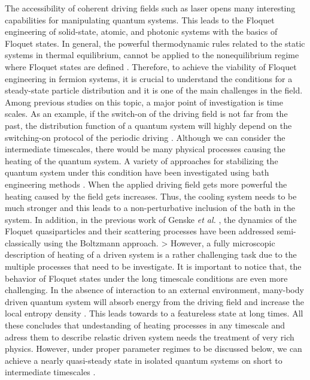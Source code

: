 \documentclass{article}
\begin{document}
The accessibility of coherent driving fields such as laser opens many interesting capabilities for manipulating quantum systems. This leads to the Floquet engineering of solid-state, atomic, and photonic systems with the basics of Floquet states. In general, the powerful thermodynamic rules related to the static systems in thermal equilibrium, cannot be applied to the nonequilibrium regime where Floquet states are defined \cite{seetharam2015}. Therefore, to achieve the viability of Floquet engineering in fermion systems, it is crucial to understand the conditions for a steady-state particle distribution and it is one of the main challenges in the field. Among previous studies on this topic, a major point of investigation is time scales. As an example, if the switch-on of the driving field is not far from the past, the distribution function of a quantum system will highly depend on the switching-on protocol of the periodic driving \cite{dehghani2014}. Although we can consider the intermediate timescales, there would be many physical processes causing the heating of the quantum system. A variety of approaches for stabilizing the quantum system under this condition have been investigated using bath engineering methods \cite{seetharam2015,weidinger2017,seetharam2019,rudner2020}. When the applied driving field gets more powerful the heating caused by the field gets increases. Thus, the cooling system needs to be much stronger and this leads to a non-perturbative inclusion of the bath in the system. In addition, in the previous work of Genske \textit{et al.} \cite{genske2015}, the dynamics of the Floquet quasiparticles and their scattering processes have been addressed semi-classically using the Boltzmann approach.
> However, a fully microscopic description of heating of a driven system is a rather challenging task due to the multiple processes that need to be investigate.
It is important to notice that, the behavior of Floquet states under the long timescale conditions are even more challenging. In the absence of interaction to an external environment, many-body driven quantum system will absorb energy from the driving field and increase the local entropy density \cite{rudner2020}. This leads towards to a featureless state at long times. All these concludes that undestanding of heating processes in any timescale and adress them to describe relastic driven system needs the treatment of very rich physics. However, under proper parameter regimes to be discussed below, we can achieve a nearly quasi-steady state in isolated quantum systems on short to intermediate timescales \cite{lindner2017,bukov2015,eckardt2015,kuwahara2016,abanin2017,mori2018,rudner2020}.
\end{document}
